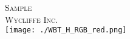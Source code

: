 \documentclass[c5paper,twoside]{article}
\begin{document}
\vskip 60pt 
\begin{center} 
\end{center} 
\newpage 
\newpage 
\thispagestyle{empty} 
\mbox{} 
\begin{titlepage}
\begin{center}
\textsc{\LARGE Sample}\\[1.5cm] 
\vspace{140 mm} 
\textsc{Wycliffe Inc.}\\[0.5cm] 
\texttt{[image: ./WBT\_H\_RGB\_red.png]}\\[1cm]    
\end{center} 
\end{titlepage} 
\newpage 
\newpage 
\mbox{} 
\setcounter{page}{3} 
 
\pagestyle{plain} 
\newpage 
\newpage 
\thispagestyle{empty} 
\mbox{} 

\pagestyle{plain} 
\tableofcontents 
\newpage 
\setcounter{page}{1} 
\end{document}

